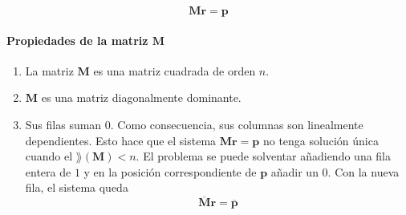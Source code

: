 \[ \mathbf{M r} = \mathbf{p} \]

\paragraph*{Propiedades de la matriz $\mathbf{M}$}

\begin{enumerate}
\item La matriz $\mathbf{M}$ es una matriz cuadrada de orden $n$.
\item $\mathbf{M}$ es una matriz diagonalmente dominante.
\item Sus filas suman $0$. Como consecuencia, sus columnas son linealmente dependientes. Esto hace que el sistema  $\mathbf{M r} = \mathbf{p}$ no tenga solución única cuando el $\rang(\mathbf{M}) < n$. El problema se puede solventar añadiendo una fila entera de $1$ y en la posición correspondiente de $\mathbf{p}$ añadir un $0$. Con la nueva fila, el sistema queda 
\begin{equation}
\overline{\mathbf{M}} \mathbf{r} = \overline{\mathbf{p}} \label{eq:massey_general}
\end{equation}
\end{enumerate}

